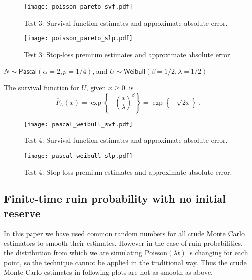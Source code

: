 \begin{figure}[H]
\centering
\texttt{[image: poisson\_pareto\_svf.pdf]}
\caption{Test 3: Survival function estimates and approximate absolute error.}
\end{figure}

\begin{figure}[H]
\centering
\texttt{[image: poisson\_pareto\_slp.pdf]}
\caption{Test 3: Stop-loss premium estimates and approximate absolute error.}
\end{figure}

\begin{test} $N\sim\mathsf{Pascal}(\alpha=2,p=1/4)$, and $U\sim\mathsf{Weibull}(\beta=1/2,\lambda=1/2)$
\end{test}
The survival function for $U$, given $x \ge 0$, is
\[ \overline{F}_U(x) = \exp\left\{ {-} \left(\frac{x}{\lambda} \right)^\beta \right\} = \exp\left\{ {-} \sqrt{2 x}  \right\} \,. \]

\begin{figure}[H]
\centering
\texttt{[image: pascal\_weibull\_svf.pdf]}
\caption{Test 4: Survival function estimates and approximate absolute error.}
\end{figure}

\begin{figure}[H]
\centering
\texttt{[image: pascal\_weibull\_slp.pdf]}
\caption{Test 4: Stop-loss premium estimates and approximate absolute error.}
\end{figure}


\subsection{Finite-time ruin probability with no initial reserve} \label{subsec:ApproximationFiniteTimeRuinProbability}



In this paper we have used common random numbers for all crude Monte Carlo estimators to smooth their estimates. However in the case of ruin probabilities, the distribution from which we are simulating $\mathrm{Poisson}(\lambda t)$ is changing for each point, so the technique cannot be applied in the traditional way. Thus the crude Monte Carlo estimates in following plots are not as smooth as above. 

